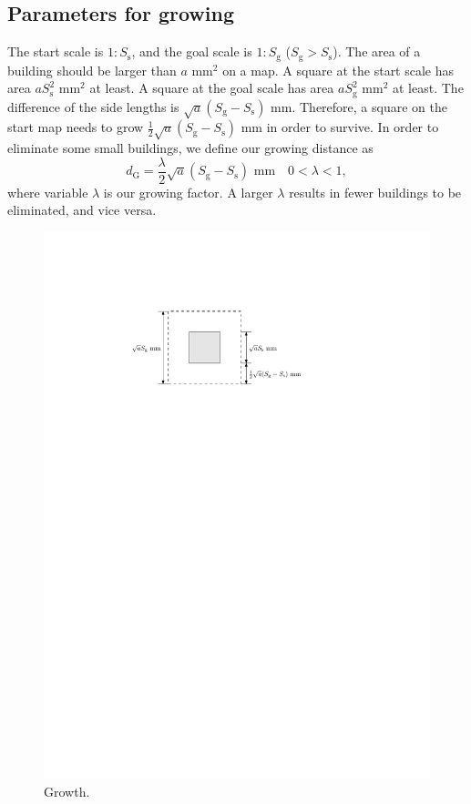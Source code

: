\documentclass[graybox]{svmult}
\begin{document}
\subsection{Parameters for growing}
The start scale is $1:S_\mathrm{s}$, and the goal scale is $1:S_\mathrm{g}$ 
($S_\mathrm{g}>S_\mathrm{s}$).
The area of a building should be larger than $a$ mm$^2$ on a map.
A square at the start scale has area $a S_\mathrm{s}^2$ mm$^2$ at least.
A square at the goal scale has area $a S_\mathrm{g}^2$ mm$^2$ at least.
The difference of the side lengths is $\sqrt{a} (S_\mathrm{g}-S_\mathrm{s})$ mm.
Therefore, a square on the start map needs to grow $\frac{1}{2}\sqrt{a} 
(S_\mathrm{g}-S_\mathrm{s})$ mm in order to survive.
In order to eliminate some small buildings, we define our growing distance as
\begin{equation}
\label{eq:d_G}
	d_\mathrm{G}=\frac{\lambda}{2}\sqrt{a} (S_\mathrm{g}-S_\mathrm{s}) \text{ 
	mm} \quad 0 < \lambda <1,
\end{equation}
where variable $\lambda$ is our growing factor. A larger $\lambda$ results in  
fewer buildings to be eliminated, and vice versa.

\begin{figure}[tb]
	\centering
	\includegraphics{Growth}
	\caption{Growth.}
	\label{fig:Growth}
\end{figure}
\end{document}

